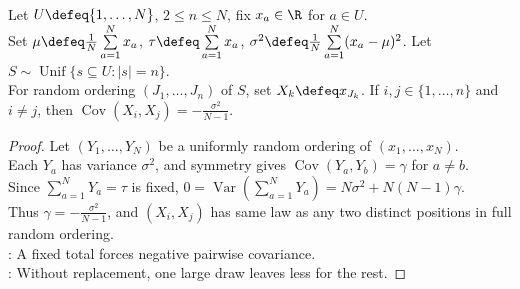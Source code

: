 \begin{lemma} \label{lem:srs-without-replacement-covariance} \\
Let $U\defeq\{1,\ldots,N\}$, $2\leq n\leq N$, fix $x_a\in\R$ for $a\in U$.\\
Set $\mu\defeq \frac{1}{N}\sum\limits_{a=1}^{N}x_a$, $\tau\defeq\sum\limits_{a=1}^{N}x_a$, $\sigma^2\defeq \frac{1}{N}\sum\limits_{a=1}^{N}(x_a-\mu)^2$. Let $S\sim\operatorname{Unif}\{s\subseteq U:|s|=n\}$.\\
For random ordering $(J_1,\ldots,J_n)$ of $S$, set $X_k\defeq x_{J_k}$. If $i,j\in\{1,\ldots,n\}$ and $i\neq j$, then $\operatorname{Cov}(X_i,X_j)=-\frac{\sigma^2}{N-1}$.
\begin{proof}
Let $(Y_1,\ldots,Y_N)$ be a uniformly random ordering of $(x_1,\ldots,x_N)$.\\
Each $Y_a$ has variance $\sigma^2$, and symmetry gives $\operatorname{Cov}(Y_a,Y_b)=\gamma$ for $a\neq b$.\\
Since $\sum\limits_{a=1}^{N}Y_a=\tau$ is fixed, $0=\operatorname{Var}(\sum\limits_{a=1}^{N}Y_a)=N\sigma^2+N(N-1)\gamma$.\\
Thus $\gamma=-\frac{\sigma^2}{N-1}$, and $(X_i,X_j)$ has same law as any two distinct positions in full random ordering.\\
: A fixed total forces negative pairwise covariance.\\
: Without replacement, one large draw leaves less for the rest.
\end{proof}
\end{lemma}

